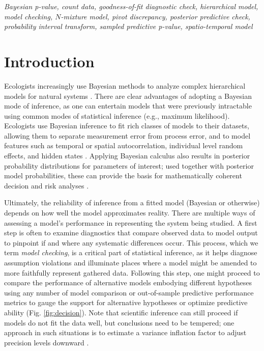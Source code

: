 \documentclass[12pt,english]{article}
\begin{document}
\begin{spacing}{1.9}
{\em Bayesian p-value, count data, goodness-of-fit diagnostic check,
  hierarchical model, model checking, $N$-mixture model, pivot
  discrepancy, posterior predictive check, probability interval
  transform, sampled predictive p-value, spatio-temporal model}



\def\VAR{{\rm Var}\,} \def\COV{{\rm Cov}\,} \def\Prob{{\rm P}\,}
\def\bfx{{\bf x}} \def\bfX{{\bf X}} \def\bfY{{\bf Y}\,} \def\bfy{{\bf
    y}} \def\bfZ{{\bf Z}\,} \def\bftheta{\boldsymbol{\theta}}
\def\bfeta{\boldsymbol{\eta}} \def\bfOmega{\boldsymbol{\Omega}}
\def\bfbeta{\boldsymbol{\beta}} \def\bfSigma{\boldsymbol{\Sigma}}
\def\bfmu{\boldsymbol{\mu}} \def\bfnu{\boldsymbol{\nu}}
\def\bfepsilon{\boldsymbol{\epsilon}} \def\R2{\rm I\!R^2}


\section{Introduction}

Ecologists increasingly use Bayesian methods to analyze complex
hierarchical models for natural systems \citep{HobbsHooten2015}.
There are clear advantages of adopting a Bayesian mode of inference,
as one can entertain models that were previously intractable using
common modes of statistical inference (e.g., maximum
likelihood). Ecologists use Bayesian inference to fit rich classes of
models to their datasets, allowing them to separate measurement error
from process error, and to model features such as temporal or spatial
autocorrelation, individual level random effects, and hidden states
\citep{LinkEtAl2002,ClarkBjornstad2004,CressieEtAl2009}. Applying
Bayesian calculus also results in posterior probability distributions
for parameters of interest; used together with posterior model
probabilities, these can provide the basis for mathematically coherent
decision and risk analyses \citep{LinkBarker2006,Berger2013,
  williams2016combining}.

Ultimately, the reliability of inference from a fitted model (Bayesian
or otherwise) depends on how well the model approximates reality.
There are multiple ways of assessing a model's performance in
representing the system being studied. A first step is often to
examine diagnostics that compare observed data to model output to
pinpoint if and where any systematic differences occur. This process,
which we term \textit{model checking}, is a critical part of
statistical inference, as it helps diagnose assumption violations and
illuminate places where a model might be amended to more faithfully
represent gathered data. Following this step, one might proceed to
compare the performance of alternative models embodying different
hypotheses using any number of model comparison or out-of-sample
predictive performance metrics \citep[see][for a
review]{HootenHobbs2015} to gauge the support for alternative
hypotheses or optimize predictive ability (Fig. \ref{fig:decision}).
Note that scientific inference can still proceed if models do not fit
the data well, but conclusions need to be tempered; one approach in
such situations is to estimate a variance inflation factor to adjust
precision levels downward
\citep[e.g.,][]{CoxSnell1989,McCullaghNelder1989}.


\end{spacing}
\end{document}
